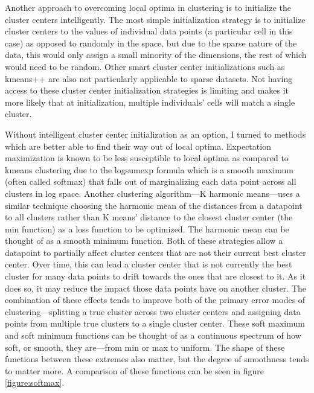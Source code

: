 \par{Another approach to overcoming local optima in clustering is to initialize the cluster centers intelligently. The most simple initialization strategy is to initialize cluster centers to the values of individual data points (a particular cell in this case) as opposed to randomly in the space, but due to the sparse nature of the data, this would only assign a small minority of the dimensions, the rest of which would need to be random. Other smart cluster center initializations such as kmeans++ are also not particularly applicable to sparse datasets\cite{kmeanspp}. Not having access to these cluster center initialization strategies is limiting and makes it more likely that at initialization, multiple individuals' cells will match a single cluster.}
\par{ Without intelligent cluster center initialization as an option, I turned to methods which are better able to find their way out of local optima. Expectation maximization is known to be less susceptible to local optima as compared to kmeans clustering due to the logsumexp formula which is a smooth maximum (often called softmax) that falls out of marginalizing each data point across all clusters in log space\cite{KHM}. Another clustering algorithm---K harmonic means---uses a similar technique choosing the harmonic mean of the distances from a datapoint to all clusters rather than K means' distance to the closest cluster center (the min function) as a loss function to be optimized. The harmonic mean can be thought of as a smooth minimum function. Both of these strategies allow a datapoint to partially affect cluster centers that are not their current best cluster center. Over time, this can lead a cluster center that is not currently the best cluster for many data points to drift towards the ones that are closest to it. As it does so, it may reduce the impact those data points have on another cluster. The combination of these effects tends to improve both of the primary error modes of clustering---splitting a true cluster across two cluster centers and assigning data points from multiple true clusters to a single cluster center. These soft maximum and soft minimum functions can be thought of as a continuous spectrum of how soft, or smooth, they are---from min or max to uniform. The shape of these functions between these extremes also matter, but the degree of smoothness tends to matter more. A comparison of these functions can be seen in figure \ref{figure:softmax}. 
}


